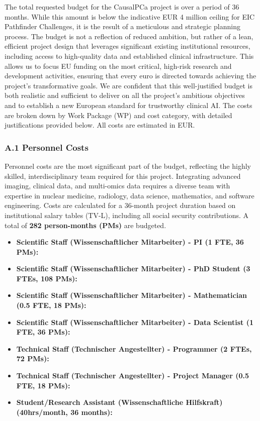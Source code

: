 \documentclass[11pt, a4paper]{article}
\begin{document}
The total requested budget for the CausalPCa project is \textbf{} over a period of 36 months. While this amount is below the indicative EUR 4 million ceiling for EIC Pathfinder Challenges, it is the result of a meticulous and strategic planning process. The budget is not a reflection of reduced ambition, but rather of a lean, efficient project design that leverages significant existing institutional resources, including access to high-quality data and established clinical infrastructure. This allows us to focus EU funding on the most critical, high-risk research and development activities, ensuring that every euro is directed towards achieving the project's transformative goals. We are confident that this well-justified budget is both realistic and sufficient to deliver on all the project's ambitious objectives and to establish a new European standard for trustworthy clinical AI. The costs are broken down by Work Package (WP) and cost category, with detailed justifications provided below. All costs are estimated in EUR.

\subsubsection*{A.1 Personnel Costs}
Personnel costs are the most significant part of the budget, reflecting the highly skilled, interdisciplinary team required for this project. Integrating advanced imaging, clinical data, and multi-omics data requires a diverse team with expertise in nuclear medicine, radiology, data science, mathematics, and software engineering. Costs are calculated for a 36-month project duration based on institutional salary tables (TV-L), including all social security contributions. A total of \textbf{282 person-months (PMs)} are budgeted.

\begin{itemize}
    \item \textbf{Scientific Staff (Wissenschaftlicher Mitarbeiter) - PI (1 FTE, 36 PMs):} 
    \item \textbf{Scientific Staff (Wissenschaftlicher Mitarbeiter) - PhD Student (3 FTEs, 108 PMs):} 
    \item \textbf{Scientific Staff (Wissenschaftlicher Mitarbeiter) - Mathematician (0.5 FTE, 18 PMs):} 
    \item \textbf{Scientific Staff (Wissenschaftlicher Mitarbeiter) - Data Scientist (1 FTE, 36 PMs):} 
    \item \textbf{Technical Staff (Technischer Angestellter) - Programmer (2 FTEs, 72 PMs):} 
    \item \textbf{Technical Staff (Technischer Angestellter) - Project Manager (0.5 FTE, 18 PMs):} 
    \item \textbf{Student/Research Assistant (Wissenschaftliche Hilfskraft) (40hrs/month, 36 months):} 
\end{itemize}
\end{document}
